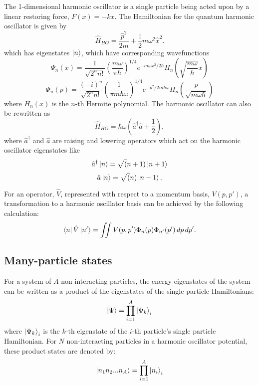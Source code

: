 The 1-dimensional harmonic oscillator is a single particle being acted upon by a linear restoring force, $F(x) = - k x$. The Hamiltonian for the quantum harmonic oscillator is given by
\begin{equation}
\hat{H}_{HO} = \frac{\hat{p}^2}{2m} + \frac{1}{2}m\omega^2\hat{x}^2.
\end{equation}
which has eigenstates $\ket{n}$, which have corresponding wavefunctions
\begin{equation}
\Psi_n(x) = \frac{1}{\sqrt{2^n n!}}\left(\frac{m \omega}{\pi \hbar}\right)^{1/4}e^{-m \omega x^2 / 2 \hbar} H_n\left(\sqrt{\frac{m \omega}{\hbar}}x\right)
\end{equation}
\begin{equation}
\Phi_n(p) = \frac{(-i)^n}{\sqrt{2^n n!}}\left(\frac{1}{\pi m \hbar \omega}\right)^{1/4}e^{-p^2 / 2 m \hbar \omega} H_n\left(\frac{p}{\sqrt{m \omega \hbar}}\right)
\end{equation}
where $H_n(x)$ is the $n$-th Hermite polynomial. The harmonic oscillator can also be rewritten as
\begin{equation}
\hat{H}_{HO} = \hbar \omega \left(\hat{a}^\dagger \hat{a} + \frac{1}{2}\right),
\end{equation}
where $\hat{a}^\dagger$ and $\hat{a}$ are raising and lowering operators which act on the harmonic oscillator eigenstates like
\begin{equation}
\hat{a}^\dagger\ket{n} = \sqrt(n + 1)\ket{n+1}
\end{equation}
\begin{equation}
\hat{a}\ket{n} = \sqrt(n)\ket{n-1}.
\end{equation}

For an operator, $\hat{V}$, represented with respect to a momentum basis, $V(p, p')$, a transformation to a harmonic oscillator basis can be achieved by the following calculation:
\begin{equation}
\bra{n}\hat{V}\ket{n'} = \iint V(p, p') \Phi_n(p) \Phi_{n'}(p') \,dp\,dp'.
\end{equation}

\subsection{Many-particle states}

For a system of $A$ non-interacting particles, the energy eigenstates of the system can be written as a product of the eigenstates of the single particle Hamiltonians:
\begin{equation}
\ket{\Psi} = \prod_{i=1}^{A}\ket{\Psi_k}_i
\end{equation}
where $\ket{\Psi_k}_i$ is the $k$-th eigenstate of the $i$-th particle's single particle Hamiltonian. For $N$ non-interacting particles in a harmonic oscillator potential, these product states are denoted by:
\begin{equation}
\ket{n_1 n_2 ... n_A} = \prod_{i=1}^{A}\ket{n_i}_i
\end{equation}


